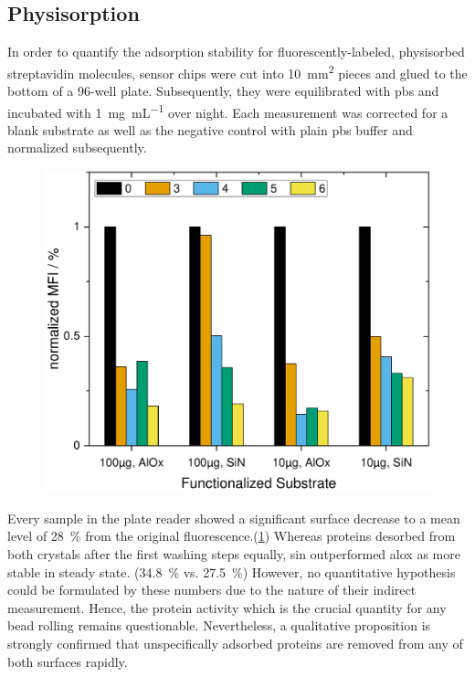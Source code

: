 \subsection{Physisorption}
\label{sec:res:physis}
In order to quantify the adsorption stability for fluorescently-labeled, physisorbed streptavidin molecules, sensor chips were cut into \SI{10}{\milli\meter\squared} pieces and glued to the bottom of a 96-well plate. Subsequently, they were equilibrated with \gls{pbs} and incubated with \SI{1}{\milli\gram\per\milli\liter} over night. Each measurement was corrected for a blank substrate as well as the negative control with plain \gls{pbs} buffer and normalized subsequently.

\begin{figure}[h!]
	\centering
	\includegraphics[width=.7\linewidth]{Ressources/ResultPlots/SurfaceFuncSiNAlOx}
	\label{fig:unsp:wash}
\end{figure}
Every sample in the plate reader showed a significant surface decrease to a mean level of \SI{28}{\percent} from the original fluorescence.(\cref{fig:unsp:wash}) Whereas proteins desorbed from both crystals after the first washing steps equally, \gls{sin} outperformed \gls{alox} as more stable in steady state. (\SI{34.8}{\percent} vs. \SI{27.5}{\percent}) However, no quantitative hypothesis could be formulated by these numbers due to the nature of their indirect measurement. Hence, the protein activity which is the crucial quantity for any bead rolling remains questionable. Nevertheless, a qualitative proposition is strongly confirmed that unspecifically adsorbed proteins are removed from any of both surfaces rapidly.


